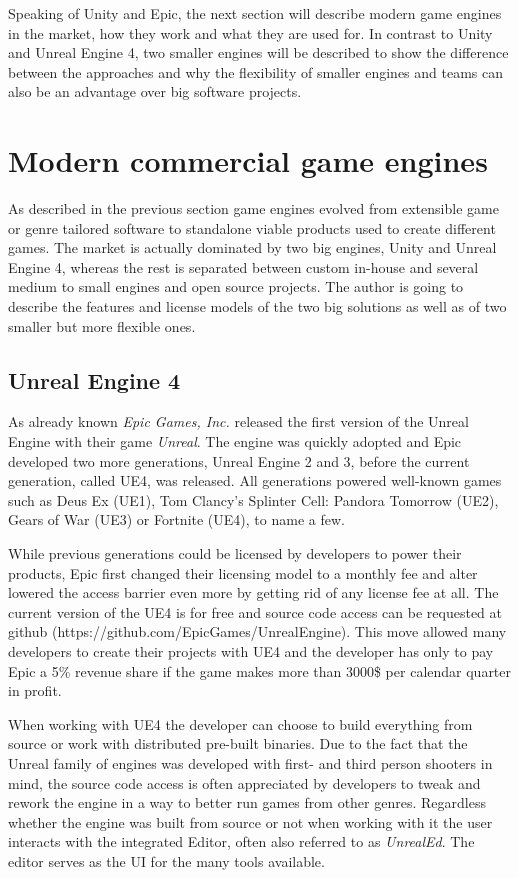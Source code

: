 Speaking of Unity and Epic, the next section will describe modern game engines in the market, how they work and what they are used for. In contrast to Unity and Unreal Engine 4, two smaller engines will be described to show the difference between the approaches and why the flexibility of smaller engines and teams can also be an advantage over big software projects.


\section{Modern commercial game engines}

As described in the previous section game engines evolved from extensible game or genre tailored software to standalone viable products used to create different games. The market is actually dominated by two big engines, Unity and Unreal Engine 4, whereas the rest is separated between custom in-house and several medium to small engines and open source projects. The author is going to describe the features and license models of the two big solutions as well as of two smaller but more flexible ones.

\subsection{Unreal Engine 4}

As already known \textit{Epic Games, Inc.} released the first version of the Unreal Engine with their game \textit{Unreal}. The engine was quickly adopted and Epic developed two more generations, Unreal Engine 2 and 3, before the current generation, called \ac{UE4}, was released. 
All generations powered well-known games such as Deus Ex (UE1), Tom Clancy’s Splinter Cell: Pandora Tomorrow (UE2), Gears of War (UE3) or Fortnite (UE4), to name a few.

While previous generations could be licensed by developers to power their products, Epic first changed their licensing model to a monthly fee and alter lowered the access barrier even more by getting rid of any license fee at all. The current version of the \ac{UE4} is for free and source code access can be requested at github (https://github.com/EpicGames/UnrealEngine). This move allowed many developers to create their projects with \ac{UE4} and the developer has only to pay Epic a 5\% revenue share if the game makes more than 3000\$ per calendar quarter in profit.

When working with \ac{UE4} the developer can choose to build everything from source or work with distributed pre-built binaries. Due to the fact that the Unreal family of engines was developed with first- and third person shooters in mind, the source code access is often appreciated by developers to tweak and rework the engine in a way to better run games from other genres. Regardless whether the engine was built from source or not when working with it the user interacts with the integrated Editor, often also referred to as \textit{UnrealEd}. The editor serves as the \ac{UI} for the many tools available. 

